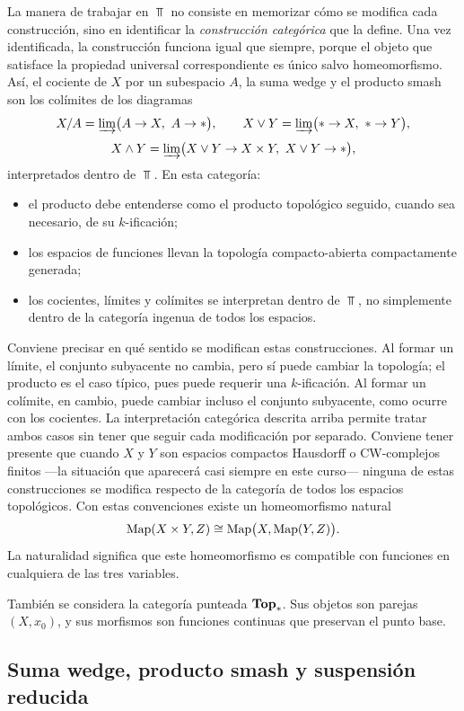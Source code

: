 La manera de trabajar en \(\Top\) no consiste en memorizar cómo se modifica cada construcción, sino en identificar la \emph{construcción categórica} que la define. Una vez identificada, la construcción funciona igual que siempre, porque el objeto que satisface la propiedad universal correspondiente es único salvo homeomorfismo. Así, el cociente de \(X\) por un subespacio \(A\), la suma wedge y el producto smash son los colímites de los diagramas
\[
X/A=\varinjlim\bigl(A\to X,\ A\to *\bigr),\qquad
X\vee Y=\varinjlim\bigl(*\to X,\ *\to Y\bigr),
\]
\[
X\wedge Y=\varinjlim\bigl(X\vee Y\to X\times Y,\ X\vee Y\to *\bigr),
\]
interpretados dentro de \(\Top\). En esta categoría:
\begin{itemize}
\item el producto debe entenderse como el producto topológico seguido, cuando sea necesario, de su \(k\)-ificación;
\item los espacios de funciones llevan la topología compacto-abierta compactamente generada;
\item los cocientes, límites y colímites se interpretan dentro de \(\Top\), no simplemente dentro de la categoría ingenua de todos los espacios.
\end{itemize}
Conviene precisar en qué sentido se modifican estas construcciones. Al formar un límite, el conjunto subyacente no cambia, pero sí puede cambiar la topología; el producto es el caso típico, pues puede requerir una \(k\)-ificación. Al formar un colímite, en cambio, puede cambiar incluso el conjunto subyacente, como ocurre con los cocientes. La interpretación categórica descrita arriba permite tratar ambos casos sin tener que seguir cada modificación por separado.
Conviene tener presente que cuando \(X\) y \(Y\) son espacios compactos Hausdorff o CW-complejos finitos ---la situación que aparecerá casi siempre en este curso--- ninguna de estas construcciones se modifica respecto de la categoría de todos los espacios topológicos.
Con estas convenciones existe un homeomorfismo natural
\[
\operatorname{Map}(X\times Y,Z)\cong \operatorname{Map}\bigl(X,\operatorname{Map}(Y,Z)\bigr).
\]
La naturalidad significa que este homeomorfismo es compatible con funciones en cualquiera de las tres variables.

También se considera la categoría punteada \(\mathbf{Top}_*\). Sus objetos son parejas \((X,x_0)\), y sus morfismos son funciones continuas que preservan el punto base.

\subsection{Suma wedge, producto smash y suspensión reducida}

